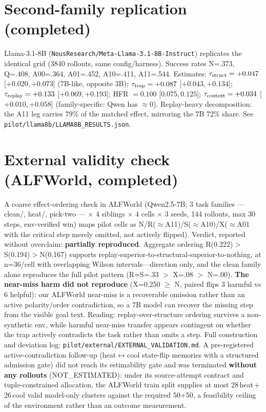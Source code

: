 \section{Second-family replication (completed)}
\label{app:llama}

Llama-3.1-8B (\texttt{NousResearch/Meta-Llama-3.1-8B-Instruct}) replicates the identical grid (3840 rollouts, same config/harness). Success rates N=.373, Q=.408, A00=.364, A01=.452, A10=.411, A11=.544. Estimates: $\tau_{\mathrm{struct}}=+0.047$ [$+0.020,+0.073$] (7B-like, opposite 3B); $\tau_{\mathrm{trap}}=+0.087$ [$+0.043,+0.134$]; $\tau_{\mathrm{replay}}=+0.133$ [$+0.069,+0.193$]; HFR $=0.100$ [$0.075,0.125$]; $\tau_{\mathrm{context}}=+0.034$ [$+0.010,+0.058$] (family-specific: Qwen has $\approx0$). Replay-heavy decomposition: the A11 leg carries 79\% of the matched effect, mirroring the 7B 72\% share. See \texttt{pilot/llama8b/LLAMA8B\_RESULTS.json}.

\section{External validity check (ALFWorld, completed)}
\label{app:alfworld}

A coarse effect-ordering check in ALFWorld \citep{alfworld2020} (Qwen2.5-7B; 3 task families --- clean/, heat/, pick-two --- $\times$ 4 siblings $\times$ 4 cells $\times$ 3 seeds, 144 rollouts, max 30 steps, env-verified win) maps pilot cells as N/R($\approx$A11)/S($\approx$A10)/X($\approx$A01 with the critical step merely omitted, not actively flipped). Verdict, reported without overclaim: \textbf{partially reproduced}. Aggregate ordering R(0.222)$>$S(0.194)$>$N(0.167) supports replay-superior-to-structural-superior-to-nothing, at n=36/cell with overlapping Wilson intervals---direction only, and the clean family alone reproduces the full pilot pattern (R=S=.33 $>$ X=.08 $>$ N=.00). \textbf{The near-miss harm did not reproduce} (X=0.250 $\geq$ N, paired flips 3 harmful vs 6 helpful): our ALFWorld near-miss is a recoverable omission rather than an active polarity/order contradiction, so a 7B model can recover the missing step from the visible goal text. Reading: replay-over-structure ordering survives a non-synthetic env, while harmful near-miss transfer appears contingent on whether the trap actively contradicts the task rather than omits a step. Full construction and deviation log: \texttt{pilot/external/EXTERNAL\_VALIDATION.md}. A pre-registered active-contradiction follow-up (heat$\leftrightarrow$cool state-flip memories with a structured admission gate) did not reach its estimability gate and was terminated \textbf{without any rollouts} (NOT\_ESTIMATED): under its source-attempt contract and tuple-constrained allocation, the ALFWorld train split supplies at most 28\,heat\,+\,26\,cool valid model-only clusters against the required 50+50, a feasibility ceiling of the environment rather than an outcome measurement.
